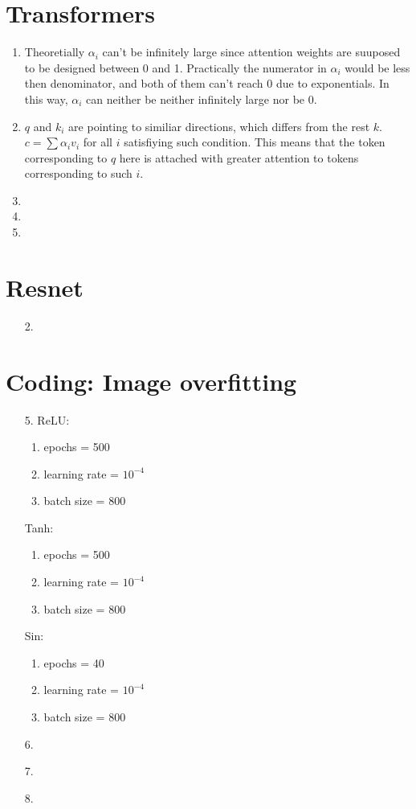 \documentclass[12pt]{article}
\begin{document}
\section{Transformers}
\begin{enumerate}
    \item Theoretially $\alpha_i$ can't be infinitely large since attention weights are suuposed to be designed between 0 and 1. Practically the numerator in $\alpha_i$ would be less then denominator, and both of them can't reach 0 due to exponentials. In this way, $\alpha_i$ can neither be neither infinitely large nor be 0.
    \item $q$ and $k_i$ are pointing to similiar directions, which differs from the rest $k$. $c = \sum \alpha_i v_i$ for all $i$ satisfiying such condition. This means that the token corresponding to $q$ here is attached with greater attention to tokens corresponding to such $i$.
    \item 
    \item 
    \item 
\end{enumerate}
\newpage

\section{Resnet}
\begin{enumerate}
    \item[2.] 
\end{enumerate}
\newpage

\section{Coding: Image overfitting}
\begin{enumerate}
    \item[5.]   
    ReLU:
    \begin{enumerate}
        \item epochs = 500
        \item learning rate = $10^{-4}$
        \item batch size = 800
    \end{enumerate}
    Tanh:
    \begin{enumerate}
        \item epochs = 500
        \item learning rate = $10^{-4}$
        \item batch size = 800
    \end{enumerate}
    Sin:
    \begin{enumerate}
        \item epochs = 40
        \item learning rate = $10^{-4}$
        \item batch size = 800
    \end{enumerate}

    \item[6.] 
    \item[7.] 
    \item[8.] 
        
\end{enumerate}
\end{document}
